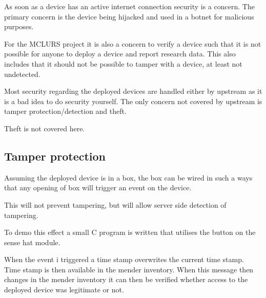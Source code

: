 \documentclass[../../main.tex]{subfiles}
\begin{document}
As soon as a device has an active internet connection security is a concern.
The primary concern is the device being hijacked and used in a botnet for malicious 
purposes.

For the MCLURS project it is also a concern to verify a device such that it is not possible for
anyone to deploy a device and report research data. This also includes that it should not be possible
to tamper with a device, at least not undetected.

Most security regarding the deployed devices are handled either by upstream as it is a bad idea to
do security yourself.
The only concern not covered by upstream is tamper protection/detection and theft.

Theft is not covered here.


%
%
%


\subsection{Tamper protection}%
\label{sub:tamper_protection}

Assuming the deployed device is in a box, the box can be wired in such a ways that any opening of
box will trigger an event on the device.

This will not prevent tampering, but will allow server side detection of tampering.

To demo this effect a small C program is written that utilises the button on the sense hat
module.

When the event i triggered a time stamp overwrites the current time stamp.
Time stamp is then available in the mender inventory.
When this message then changes in the mender inventory it can then be verified
whether access to the deployed device was legitimate or not.
\end{document}
